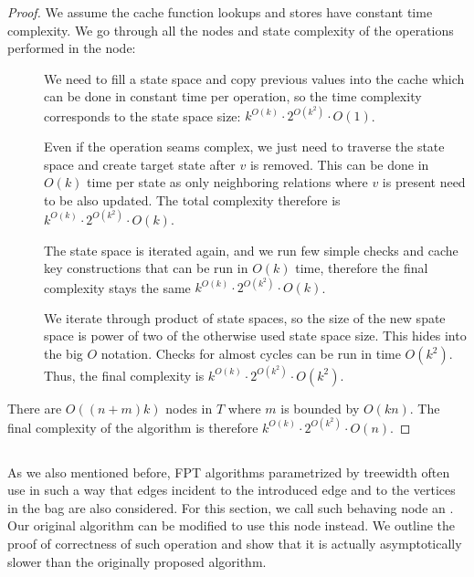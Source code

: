 \begin{proof}
	We assume the cache function lookups and stores have constant time complexity.
	We go through all the nodes and state complexity of the operations performed in the node:
	\begin{description}
		\item[\IntroduceVertexNode{}]
		      We need to fill a state space and copy previous values into the cache
		      which can be done in constant time per operation,
		      so the time complexity corresponds to the state space size:
		      \( {k}^{O(k)} \cdot 2^{O(k^2)} \cdot O(1) \).
		\item[\ForgetVertexNode{}]
		      Even if the operation seams complex, we just need to traverse the state space
		      and create target state after \( v \) is removed.
					This can be done in \( O(k) \) time
					per state as only neighboring relations where \( v \) is present
					need to be also updated.
					The total complexity therefore is
		      \( {k}^{O(k)} \cdot 2^{O(k^2)} \cdot O(k) \).
		\item[\IntroduceEdgeNode{}]
		      The state space is iterated again, and we run few simple checks and cache key constructions
		      that can be run in \( O(k) \) time, therefore the final complexity stays the same
		      \( {k}^{O(k)} \cdot 2^{O(k^2)} \cdot O(k) \).
		\item[\JoinNode{}]
		      We iterate through product of state spaces,
		      so the size of the new spate space is power of two
		      of the otherwise used state space size.
		      This hides into the big \( O \) notation.
		      Checks for almost cycles can be run in time \( O(k^2) \).
		      Thus, the final complexity is
		      \( {k}^{O(k)} \cdot 2^{O(k^2)} \cdot O(k^2) \).
	\end{description}
	There are \( O((n+m)k) \) nodes in \( T \) where \( m \) is bounded by \( O(kn) \).
	The final complexity of the algorithm is therefore
	\( {k}^{O(k)} \cdot 2^{O(k^2)} \cdot O(n) \).
\end{proof}
%

\subsection{\IntroduceVertexWithEdgesNode{}}

As we also mentioned before, FPT algorithms parametrized by treewidth
often use \IntroduceVertexNode{} in such a way
that edges incident to the introduced edge and to
the vertices in the bag are also considered.
For this section, we call such behaving node an \IntroduceVertexWithEdgesNode{}.
Our original algorithm can be modified to use this node instead.
We outline the proof of correctness of such operation and show
that it is actually asymptotically slower than the originally proposed algorithm.

